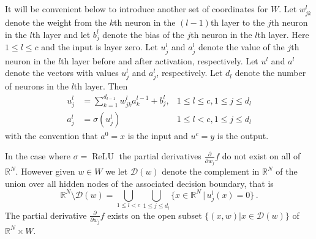 \documentclass{article} %
\begin{document}
It will be convenient below to introduce another set of coordinates for $W$. Let $w_{jk}^{l}$ denote the weight from the $k$th neuron in the $(l-1)$th layer to the $j$th neuron in the $l$th layer and let $b_j^{l}$ denote the bias of the $j$th neuron in the $l$th layer. Here $1 \le l \le c$ and the input is layer zero. Let $u_{j}^{l}$ and $a_{j}^{l}$ denote the value of the $j$th neuron in the $l$th layer before and after activation, respectively. Let $u^{l}$ and $a^{l}$ denote the vectors with values $u_{j}^{l}$ and $a_{j}^{l}$, respectively. Let $d_{l}$ denote the number of neurons in the $l$th layer. Then
\begin{align*}
	u_{j}^{l} &=\sum_{k=1}^{d_{l-1}}w_{jk}^{l}a_{k}^{l-1}+b_{j}^{l}, &1 \le l \le c, 1 \le j \le d_l\\
	a_{j}^{l} &=\sigma(u_{j}^{l}) & 1 \le l < c, 1 \le j \le d_l
\end{align*}
with the convention that $a^0 = x$ is the input and $u^c = y$ is the output.

In the case where $\sigma = \operatorname{ReLU}$ the partial derivatives $\frac{\partial}{\partial w_j} f$ do not exist on all of $\mathbb{R}^N$. However given $w \in W$ we let $\mathcal{D}(w)$ denote the complement in $\mathbb{R}^N$ of the union over all hidden nodes of the associated decision boundary, that is
\[
\mathbb{R}^N \setminus \mathcal{D}(w) = \bigcup_{1 \le l < c} \bigcup_{1 \le j \le d_l} \{ x \in \mathbb{R}^N \,|\, u^l_j(x) = 0 \}\,.
\]
The partial derivative $\frac{\partial}{\partial w_j} f$ exists on the open subset $\{ (x,w) | x \in \mathcal{D}(w) \}$ of $\mathbb{R}^N \times W$. 
\end{document}

